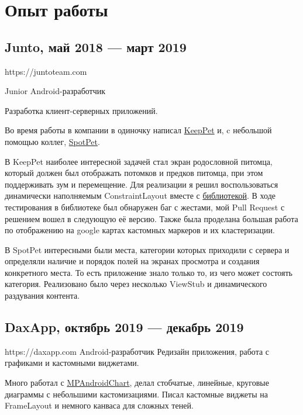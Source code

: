\documentclass[a4paper,12pt]{article}
\begin{document}
    \section*{Опыт работы}

    \subsection*{Junto, май 2018 --- март 2019}
    
    https://juntoteam.com\par
    Junior Android-разработчик\par
    Разработка клиент-серверных приложений.\par

    Во время работы в компании в одиночку написал \href{https://play.google.com/store/apps/details?id=com.juntoteam.keeppet}{KeepPet} и, c небольшой помощью коллег, \href{https://play.google.com/store/apps/details?id=com.juntoteam.spotpet}{SpotPet}. 

    В KeepPet наиболее интересной задачей стал экран родословной питомца, который должен был отображать потомков и предков питомца, при этом поддерживать зум и перемещение. Для реализации я решил воспользоваться динамически наполняемым ConstraintLayout вместе с \href{https://github.com/natario1/ZoomLayout}{библиотекой}. В ходе тестирования в библиотеке был обнаружен баг с жестами, мой Pull Request с решением вошел в следующую её версию. Также была проделана большая работа по отображению на google картах  кастомных маркеров и их кластеризации.

    В SpotPet интересными были места, категории которых приходили с сервера и определяли наличие и порядок полей на экранах просмотра и создания конкретного места. То есть приложение знало только то, из чего может состоять категория. Реализовано было через несколько ViewStub и динамического раздувания контента.

    \subsection*{DaxApp, октябрь 2019 --- декабрь 2019}

    https://daxapp.com
    Android-разработчик
    Редизайн приложения, работа с графиками и кастомными виджетами.

    Много работал с \href{https://github.com/PhilJay/MPAndroidChart}{MPAndroidChart}, делал стобчатые, линейные, круговые диаграммы с небольшими кастомизациями. Писал кастомные виджеты на FrameLayout и немного канваса для сложных теней.
\end{document}
